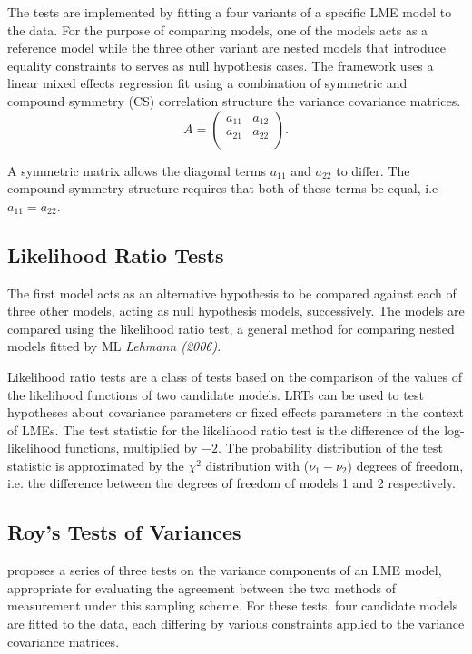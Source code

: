 \documentclass[12pt, a4paper]{report}
\theoremstyle{plain}
\theoremstyle{definition}
\theoremstyle{remark}
\begin{document}
The tests are implemented by fitting a four variants of a specific LME model to the data. For the purpose of comparing models, one of the models acts as a reference model while the three other variant are nested models that introduce equality constraints to serves as null hypothesis cases. The framework uses a linear mixed effects regression fit using a combination of symmetric and compound symmetry (CS) correlation structure the variance covariance matrices.
\[
{A} = \left( \begin{array}{cc}
a_{11} & a_{12}  \\
a_{21} & a_{22}  \\
\end{array}\right).
\]

A symmetric matrix allows the diagonal terms $a_{11}$ and $a_{22}$ to differ. The compound symmetry structure requires that both of these terms be equal, i.e $a_{11} = a_{22}$.

\subsection{Likelihood Ratio Tests}
The first model acts as an alternative hypothesis to be compared against each of three other models, acting as null hypothesis models, successively. The models are compared using the likelihood ratio test, a general method for comparing nested models fitted by ML \citep{Lehmann2006} \textit{Lehmann (2006)}.

Likelihood ratio tests are a class of tests based on the comparison of the values of the likelihood functions of two candidate models. LRTs can be used to test hypotheses about covariance parameters or fixed effects parameters in the context of LMEs. The test statistic for the likelihood ratio test is the difference of the log-likelihood functions, multiplied by $-2$.
The probability distribution of the test statistic is approximated by the $\chi^2$ distribution with ($\nu_{1} - \nu_{2}$) degrees of freedom, i.e. the difference between the degrees of freedom of models 1 and 2 respectively.



\subsection{Roy's Tests of Variances}


\citet{ARoy2009} proposes a series of three tests on the variance components of an LME model, appropriate for evaluating the agreement between the two methods of measurement under this sampling scheme. For these tests, four candidate models are fitted to the data, each differing by various constraints applied to the variance covariance matrices.
\end{document}
